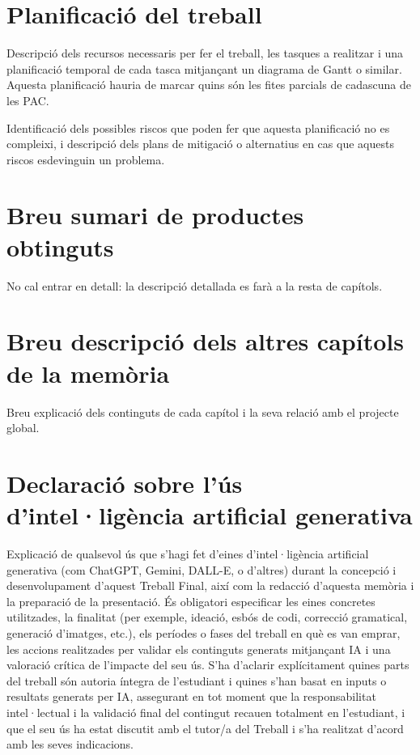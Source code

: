 \documentclass[CAT,BIB]{TFUOC}%
\begin{document}
\section{Planificació del treball}

Descripció dels recursos necessaris per fer el treball, les tasques a realitzar i una planificació temporal de cada tasca mitjançant un diagrama de Gantt o similar. Aquesta planificació hauria de marcar quins són les fites parcials de cadascuna de les PAC.


Identificació dels possibles riscos que poden fer que aquesta planificació no es compleixi, i descripció dels plans de mitigació o alternatius en cas que aquests riscos esdevinguin un problema.

\section{Breu sumari de productes obtinguts}

No cal entrar en detall: la descripció detallada es farà a la resta de capítols.


\section{Breu descripció dels altres capítols de la memòria}

Breu explicació dels continguts de cada capítol i la seva relació amb el projecte global.

\section{Declaració sobre l’ús d’intel·ligència artificial generativa}

Explicació de qualsevol ús que s'hagi fet d'eines d'intel·ligència artificial generativa (com ChatGPT, Gemini, DALL-E, o d'altres) durant la concepció i desenvolupament d'aquest Treball Final, així com la redacció d'aquesta memòria i la preparació de la presentació. És obligatori especificar les eines concretes utilitzades, la finalitat (per exemple, ideació, esbós de codi, correcció gramatical, generació d'imatges, etc.), els períodes o fases del treball en què es van emprar, les accions realitzades per validar els continguts generats mitjançant IA i una valoració crítica de l'impacte del seu ús. S'ha d'aclarir explícitament quines parts del treball són autoria íntegra de l'estudiant i quines s'han basat en inputs o resultats generats per IA, assegurant en tot moment que la responsabilitat intel·lectual i la validació final del contingut recauen totalment en l'estudiant, i que el seu ús ha estat discutit amb el tutor/a del Treball i s'ha realitzat d'acord amb les seves indicacions.
\end{document}
